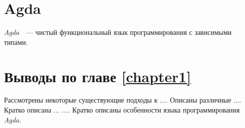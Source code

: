 \section{Agda}
\textit{Agda}~\cite{AgdaLang}~---  чистый функциональный язык программирования с зависимыми типами.



\section{Выводы по главе \ref{chapter1}}
Рассмотрены некоторые существующие подходы к ....
Описаны различные ....
Кратко описана ... \textit{...}.
Кратко описаны особенности языка программирования \textit{Agda}.

